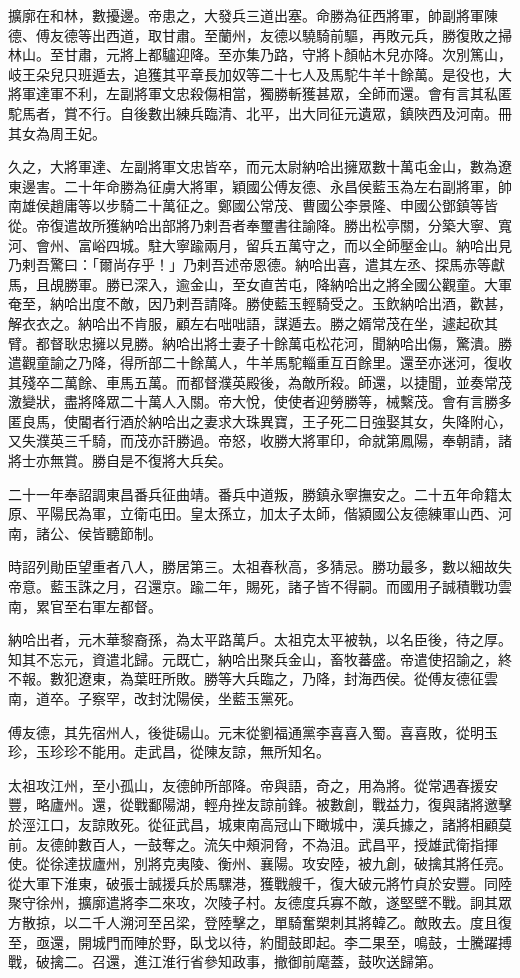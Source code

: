 \begin{pinyinscope}
擴廓在和林，數擾邊。帝患之，大發兵三道出塞。命勝為征西將軍，帥副將軍陳德、傅友德等出西道，取甘肅。至蘭州，友德以驍騎前驅，再敗元兵，勝復敗之掃林山。至甘肅，元將上都驢迎降。至亦集乃路，守將卜顏帖木兒亦降。次別篤山，岐王朵兒只班遁去，追獲其平章長加奴等二十七人及馬駝牛羊十餘萬。是役也，大將軍達軍不利，左副將軍文忠殺傷相當，獨勝斬獲甚眾，全師而還。會有言其私匿駝馬者，賞不行。自後數出練兵臨清、北平，出大同征元遺眾，鎮陜西及河南。冊其女為周王妃。

久之，大將軍達、左副將軍文忠皆卒，而元太尉納哈出擁眾數十萬屯金山，數為遼東邊害。二十年命勝為征虜大將軍，穎國公傅友德、永昌侯藍玉為左右副將軍，帥南雄侯趙庸等以步騎二十萬征之。鄭國公常茂、曹國公李景隆、申國公鄧鎮等皆從。帝復遣故所獲納哈出部將乃剌吾者奉璽書往諭降。勝出松亭關，分築大寧、寬河、會州、富峪四城。駐大寧踰兩月，留兵五萬守之，而以全師壓金山。納哈出見乃剌吾驚曰：「爾尚存乎！」乃剌吾述帝恩德。納哈出喜，遣其左丞、探馬赤等獻馬，且覘勝軍。勝已深入，逾金山，至女直苦屯，降納哈出之將全國公觀童。大軍奄至，納哈出度不敵，因乃剌吾請降。勝使藍玉輕騎受之。玉飲納哈出酒，歡甚，解衣衣之。納哈出不肯服，顧左右咄咄語，謀遁去。勝之婿常茂在坐，遽起砍其臂。都督耿忠擁以見勝。納哈出將士妻子十餘萬屯松花河，聞納哈出傷，驚潰。勝遣觀童諭之乃降，得所部二十餘萬人，牛羊馬駝輜重互百餘里。還至亦迷河，復收其殘卒二萬餘、車馬五萬。而都督濮英殿後，為敵所殺。師還，以捷聞，並奏常茂激變狀，盡將降眾二十萬人入關。帝大悅，使使者迎勞勝等，械繫茂。會有言勝多匿良馬，使閽者行酒於納哈出之妻求大珠異寶，王子死二日強娶其女，失降附心，又失濮英三千騎，而茂亦訐勝過。帝怒，收勝大將軍印，命就第鳳陽，奉朝請，諸將士亦無賞。勝自是不復將大兵矣。

二十一年奉詔調東昌番兵征曲靖。番兵中道叛，勝鎮永寧撫安之。二十五年命籍太原、平陽民為軍，立衛屯田。皇太孫立，加太子太師，偕潁國公友德練軍山西、河南，諸公、侯皆聽節制。

時詔列勛臣望重者八人，勝居第三。太祖春秋高，多猜忌。勝功最多，數以細故失帝意。藍玉誅之月，召還京。踰二年，賜死，諸子皆不得嗣。而國用子誠積戰功雲南，累官至右軍左都督。

納哈出者，元木華黎裔孫，為太平路萬戶。太祖克太平被執，以名臣後，待之厚。知其不忘元，資遣北歸。元既亡，納哈出聚兵金山，畜牧蕃盛。帝遣使招諭之，終不報。數犯遼東，為葉旺所敗。勝等大兵臨之，乃降，封海西侯。從傅友德征雲南，道卒。子察罕，改封沈陽侯，坐藍玉黨死。

傅友德，其先宿州人，後徙碭山。元末從劉福通黨李喜喜入蜀。喜喜敗，從明玉珍，玉珍珍不能用。走武昌，從陳友諒，無所知名。

太祖攻江州，至小孤山，友德帥所部降。帝與語，奇之，用為將。從常遇春援安豐，略廬州。還，從戰鄱陽湖，輕舟挫友諒前鋒。被數創，戰益力，復與諸將邀擊於涇江口，友諒敗死。從征武昌，城東南高冠山下瞰城中，漢兵據之，諸將相顧莫前。友德帥數百人，一鼓奪之。流矢中頰洞脅，不為沮。武昌平，授雄武衛指揮使。從徐達拔廬州，別將克夷陵、衡州、襄陽。攻安陸，被九創，破擒其將任亮。從大軍下淮東，破張士誠援兵於馬騾港，獲戰艘千，復大破元將竹貞於安豐。同陸聚守徐州，擴廓遣將李二來攻，次陵子村。友德度兵寡不敵，遂堅壁不戰。詗其眾方散掠，以二千人溯河至呂梁，登陸擊之，單騎奮槊刺其將韓乙。敵敗去。度且復至，亟還，開城門而陣於野，臥戈以待，約聞鼓即起。李二果至，鳴鼓，士騰躍搏戰，破擒二。召還，進江淮行省參知政事，撤御前麾蓋，鼓吹送歸第。


\end{pinyinscope}
